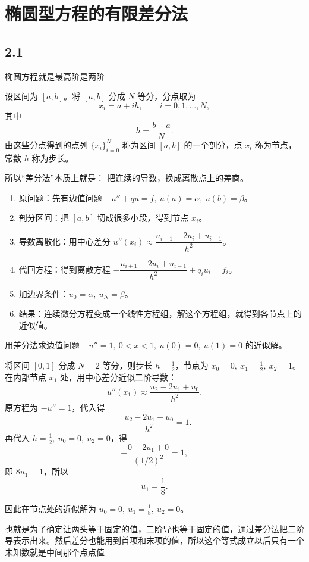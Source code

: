 \chapter{椭圆型方程的有限差分法}
\section{2.1}
椭圆方程就是最高阶是两阶
\begin{definition}[区间剖分与步长]
设区间为 \([a,b]\)。将 \([a,b]\) 分成 \(N\) 等分，分点取为
\[
x_i=a+ih,\qquad i=0,1,\dots,N,
\]
其中
\[
h=\frac{b-a}{N}.
\]
由这些分点得到的点列 \(\{x_i\}_{i=0}^N\) 称为区间 \([a,b]\) 的一个剖分，点 \(x_i\) 称为节点，常数 \(h\) 称为步长。
\end{definition}
所以“差分法”本质上就是：
把连续的导数，换成离散点上的差商。
\begin{enumerate}
    \item 原问题：先有边值问题 \(-u''+qu=f,\ u(a)=\alpha,\ u(b)=\beta\)。
    \item 剖分区间：把 \([a,b]\) 切成很多小段，得到节点 \(x_i\)。
    \item 导数离散化：用中心差分 \(u''(x_i)\approx \dfrac{u_{i+1}-2u_i+u_{i-1}}{h^2}\)。
    \item 代回方程：得到离散方程 \(-\dfrac{u_{i+1}-2u_i+u_{i-1}}{h^2}+q_i u_i=f_i\)。
    \item 加边界条件：\(u_0=\alpha,\ u_N=\beta\)。
    \item 结果：连续微分方程变成一个线性方程组，解这个方程组，就得到各节点上的近似值。
\end{enumerate}
\begin{example}
用差分法求边值问题 \(-u''=1,\ 0<x<1,\ u(0)=0,\ u(1)=0\) 的近似解。

将区间 \([0,1]\) 分成 \(N=2\) 等分，则步长 \(h=\frac12\)，节点为 \(x_0=0,\ x_1=\frac12,\ x_2=1\)。在内部节点 \(x_1\) 处，用中心差分近似二阶导数：
\[
u''(x_1)\approx \frac{u_2-2u_1+u_0}{h^2}.
\]
原方程为 \(-u''=1\)，代入得
\[
-\frac{u_2-2u_1+u_0}{h^2}=1.
\]
再代入 \(h=\frac12,\ u_0=0,\ u_2=0\)，得
\[
-\frac{0-2u_1+0}{(1/2)^2}=1,
\]
即 \(8u_1=1\)，所以
\[
u_1=\frac18.
\]

因此在节点处的近似解为 \(u_0=0,\ u_1=\frac18,\ u_2=0\)。
\end{example}
\begin{dxtips}
    也就是为了确定让两头等于固定的值，二阶导也等于固定的值，通过差分法把二阶导表示出来。然后差分也能用到首项和末项的值，所以这个等式成立以后只有一个未知数就是中间那个点点值
\end{dxtips}
